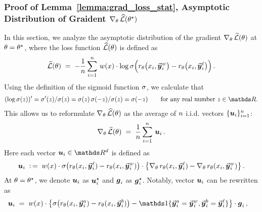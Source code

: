 	
	\subsubsection{Proof of Lemma~\ref{lemma:grad_loss_stat}, Asymptotic Distribution of Graident $\nabla_{\theta} \,  \widehat{\mathcal{L}}(\theta^{\star})$}
	\label{sec:proof:lemma:grad_loss_stat}
	
	In this section, we analyze the asymptotic distribution of the gradient $\nabla_{\theta} \,  \widehat{\mathcal{L}}(\theta)$ at $\theta = \theta^{\star}$, where the loss function $\widehat{\mathcal{L}}(\theta)$ is defined as
	\begin{align*}
		\widehat{\mathcal{L}}(\theta) \; = \;
		- \frac{1}{n} \sum_{i=1}^{n} \, w(x) \cdot \log \sigma \Big( r_{\theta}\big(x_{i}, \vec{\boldsymbol{y}}\!\,^w_{i}\big) - r_{\theta}\big(x_{i}, \vec{\boldsymbol{y}}\!\,^{\ell}_{i}\big) \Big) \, .
	\end{align*}
	Using the definition of the sigmoid function $\sigma$, we calculate that
	\begin{align*}
		( \log \sigmoid(z) )' = \divsigmoid(z) / \sigmoid(z) = \sigmoid(z) \, \sigmoid(-z) / \sigmoid(z) = \sigmoid(-z) \qquad \mbox{for any real number $z \in \Real$}.
	\end{align*}
	This allows us to reformulate $\nabla_{\theta} \,  \widehat{\mathcal{L}}(\theta)$ as the average of $n$ i.i.d. vectors $\{ \boldsymbol{u}_{i} \}_{i=1}^{n}$:
	\begin{align}
		\label{eq:gradLosshat}
		\nabla_{\theta} \,  \widehat{\mathcal{L}}(\theta)
		\; = \; \frac{1}{n} \sum_{i=1}^{n} \, \boldsymbol{u}_{i} \, .
	\end{align}
	Here each vector $\vecgi{i} \in \Real^{\Dim}$ is defined as
	\begin{align*}
		\boldsymbol{u}_{i} \; :\,= \; w(x) \cdot \sigma \big( r_{\theta}(x_{i}, \vec{\boldsymbol{y}}\!\,^{\ell}_{i}) - r_{\theta}(x_{i}, \vec{\boldsymbol{y}}\!\,^w_{i}) \big) \cdot \big\{ \nabla_{\theta} \,  r_{\theta}(x_{i}, \vec{\boldsymbol{y}}\!\,^{\ell}_{i}) - \nabla_{\theta} \,  r_{\theta}(x_{i}, \vec{\boldsymbol{y}}\!\,^w_{i}) \big\} \, .
	\end{align*}
	At $\theta = \theta^{\star}$, we denote $\boldsymbol{u}_{i}$ as $\boldsymbol{u}^{\star}_{i}$ and $\boldsymbol{g}_{i}$ as $\boldsymbol{g}_{i}^{\star}$. Notably, vector $\boldsymbol{u}_{i}$ can be rewritten as
	\begin{align}
		\label{eq:vecgi2}
		\vecgi{i} 
		& \; = \; \weight(\prompt) \cdot \big\{ \sigmoid \big( \rewardtheta(\prompti{i}, \responseonei{i}) - \rewardtheta(\prompti{i}, \responsetwoi{i}) \big) - \indicator\{ \responseonei{i} = \responsewini{i}, \responsetwoi{i} = \responselosei{i} \} \big\}
		\cdot \gradi{i} \, ,
	\end{align}
